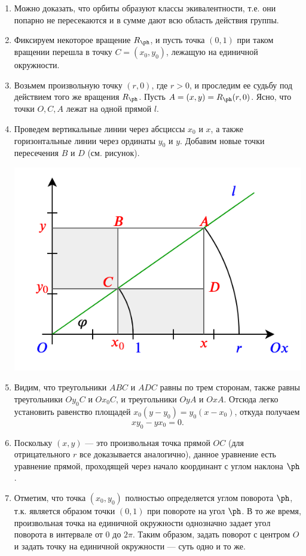 \begin{enumerate}
\item Можно доказать, что орбиты образуют классы экивалентности, т.е. они попарно не пересекаются и в сумме дают всю область действия группы.
\item Фиксируем некоторое вращение $R_\ph$, и пусть точка $(0,1)$ при таком вращении перешла в точку $C=(x_0,y_0)$, лежащую на единичной окружности.
\item Возьмем произвольную точку $(r,0)$, где $r>0$, и проследим ее судьбу под действием того же вращения $R_\ph$. Пусть $A=(x,y)=R_\ph(r,0)$. Ясно, что точки $O,C,A$ лежат на одной прямой $l$.
\item Проведем вертикальные линии через абсциссы $x_0$ и $x$, а также горизонтальные линии через ординаты $y_0$ и $y$. Добавим новые точки пересечения $B$ и $D$ (см. рисунок).

\begin{center}
\includegraphics[scale=0.5]{linerotation.png}
\end{center}
\item Видим, что треугольники $ABC$ и $ADC$ равны по трем сторонам, также равны треугольники $Oy_0C$ и $Ox_0C$, и треугольники $OyA$ и $OxA$. Отсюда легко установить равенство площадей $x_0(y-y_0)=y_0(x-x_0)$, откуда получаем
$$
xy_0-yx_0=0.
$$
\item Поскольку $(x,y)$ --- это произвольная точка прямой $OC$ (для отрицательного $r$ все доказывается аналогично),  данное уравнение есть уравнение прямой, проходящей через начало координант с углом наклона $\ph$.
\item Отметим, что точка $(x_0,y_0)$ полностью определяется углом поворота $\ph$, т.к. является образом точки $(0,1)$ при повороте на угол $\ph$. В то же время, произвольная точка на единичной окружности однозначно задает угол поворота в интервале от 0 до $2\pi$. Таким образом, задать поворот с центром $O$ и задать точку на единичной окружности --- суть одно и то же.

\end{enumerate}
